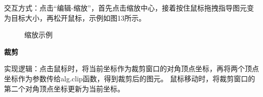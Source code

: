 \documentclass[a4paper,UTF8]{article}
\begin{document}
交互方式：点击“编辑-缩放”，首先点击缩放中心，接着按住鼠标拖拽指导图元变为目标大小，再松开鼠标，示例如图13所示。
\begin{figure}[H]
    \centering
        \caption{缩放示例}
\end{figure}

\textbf{裁剪}

实现逻辑：点击鼠标时，将当前坐标作为裁剪窗口的对角顶点坐标，再将两个顶点坐标作为参数传给alg.clip函数，得到裁剪后的图元。
鼠标移动时，将裁剪窗口的第二个对角顶点坐标更新为当前坐标。
\end{document}

